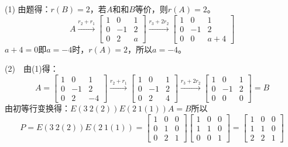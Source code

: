 \documentclass{article}
\begin{document}
\begin{jie}
(1)
由题得：$r(B)=2$，若$A$和和$B$等价，则$r(A)=2$。
\begin{equation*}
 A\xrightarrow{r_{2}+ r_{1}}
{
\begin{bmatrix}
  1 & 0 & 1\\
  0 & -1 & 2\\
  0 & 2 & a
\end{bmatrix}
}\xrightarrow{r_{3}+2r_{2}}
{
\begin{bmatrix}
  1 & 0 & 1\\
  0 & -1 & 2\\
  0 & 0 & a+4
\end{bmatrix}
}
\end{equation*}
$a+4=0$即$a=-4$时，$r(A)=2$，所以$a=-4$。

(2)~~由(1)得：
\begin{equation*}A=
  \begin{bmatrix}
  1 & 0 & 1\\
  0 & -1 & 2\\
  0 & 2 & -4
  \end{bmatrix}\xrightarrow{r_{2}+r_{1}}
{
\begin{bmatrix}
  1 & 0 & 1\\
  0 & -1 & 2\\
  0 & 2 & 4
\end{bmatrix}
}\xrightarrow{r_{3}+2r_{2}}
{
\begin{bmatrix}
  1 & 0 & 1\\
  0 & -1 & 2\\
  0 & 0 & 0
\end{bmatrix}
}=B
\end{equation*}
由初等行变换得：$E(3~2(2))E(2~1(1))A=B$所以
\begin{equation*}
P=E(3~2(2))E(2~1(1))=
  \begin{bmatrix}
    1 & 0 & 0\\
    0 & 1& 0\\
    0 & 2& 1
  \end{bmatrix}
   \begin{bmatrix}
    1 & 0 & 0\\
    1 & 1& 0\\
    0 & 0& 1
  \end{bmatrix}=
   \begin{bmatrix}
    1 & 0 & 0\\
    1 & 1& 0\\
    2 & 2& 1
  \end{bmatrix}
\end{equation*}
\end{jie}
\end{document}
